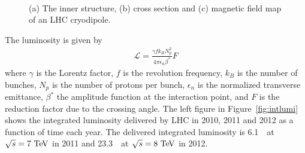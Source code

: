 
%
\begin{figure}[ht!] 
\vspace{1cm}
\\
\caption{(a) The inner structure, (b) cross section and (c) magnetic field map of
an LHC cryodipole.} 
\label{fig:SCdipole} 
\end{figure} 

The luminosity is given by 
\begin{eqnarray} 
\mathcal{L} = \frac{\gamma f k_B N_p^2}{4 \pi \epsilon_n \beta^*} F 
\end{eqnarray} 
where $\gamma$ is the Lorentz factor, 
$f$ is the revolution frequency, 
$k_B$ is the number of bunches,
$N_p$ is the number of protons per bunch, 
$\epsilon_n$ is the normalized transverse emittance, 
$\beta^*$ the amplitude function at the interaction point, 
and $F$ is the reduction factor due to the crossing angle.
The left figure in Figure~\ref{fig:intlumi} shows the integrated luminosity 
delivered by LHC in 2010, 2011 and 2012 as a function of time each year. 
The delivered integrated luminosity is 6.1~\ifb\ at $\sqrt{s}=7~\mathrm{Te\kern -0.1em V}$ in 2011
and 23.3~\ifb\ at $\sqrt{s}=8~\mathrm{Te\kern -0.1em V}$ in 2012. 

